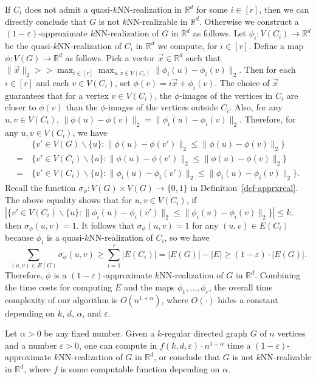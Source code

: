 If $C_i$ does not admit a quasi-$k$NN-realization in $\mathbb{R}^d$ for some $i \in [r]$, then we can directly conclude that $G$ is not $k$NN-realizable in $\mathbb{R}^d$.
Otherwise we construct a $(1-\varepsilon)$-approximate $k$NN-realization of $G$ in $\mathbb{R}^d$ as follows.
Let $\phi_i:V(C_i) \rightarrow \mathbb{R}^d$ be the quasi-$k$NN-realization of $C_i$ in $\mathbb{R}^d$ we compute, for $i \in [r]$.
Define a map $\phi:V(G) \rightarrow \mathbb{R}^d$ as follows.
Pick a vector $\vec{x} \in \mathbb{R}^d$ such that $\lVert \vec{x} \rVert_2 >> \max_{i \in [r]} \max_{u,v \in V(C_i)} \lVert \phi_i(u) - \phi_i(v) \rVert_2$.
Then for each $i \in [r]$ and each $v \in V(C_i)$, set $\phi(v) = i \vec{x} + \phi_i(v)$.
The choice of $\vec{x}$ guarantees that for a vertex $v \in V(C_i)$, the $\phi$-images of the vertices in $C_i$ are closer to $\phi(v)$ than the $\phi$-images of the vertices outside $C_i$.
Also, for any $u,v \in V(C_i)$, $\lVert \phi(u) - \phi(v) \rVert_2 = \lVert \phi_i(u) - \phi_i(v) \rVert_2$.
Therefore, for any $u,v \in V(C_i)$, we have
\begin{align*}
    & \ \{v' \in V(G) \backslash \{u\}: \lVert \phi(u) - \phi(v') \rVert_2 \leq \lVert \phi(u) - \phi(v) \rVert_2\} \\
    = & \ \{v' \in V(C_i) \backslash \{u\}: \lVert \phi(u) - \phi(v') \rVert_2 \leq \lVert \phi(u) - \phi(v) \rVert_2\} \\
    = & \ \{v' \in V(C_i) \backslash \{u\}: \lVert \phi_i(u) - \phi_i(v') \rVert_2 \leq \lVert \phi_i(u) - \phi_i(v) \rVert_2\}.
\end{align*}
Recall the function $\sigma_\phi:V(G) \times V(G) \rightarrow \{0,1\}$ in Definition~\ref{def-apprxreal}.
The above equality shows that for $u,v \in V(C_i)$, if $|\{v' \in V(C_i) \backslash \{u\}: \lVert \phi_i(u) - \phi_i(v') \rVert_2 \leq \lVert \phi_i(u) - \phi_i(v) \rVert_2\}| \leq k$, then $\sigma_\phi(u,v) = 1$.
It follows that $\sigma_\phi(u,v) = 1$ for any $(u,v) \in E(C_i)$ because $\phi_i$ is a quasi-$k$NN-realization of $C_i$,
so we have
\begin{equation*}
    \sum_{(u,v) \in E(G)} \sigma_\phi(u,v) \geq \sum_{i=1}^r |E(C_i)| = |E(G)| - |E| \geq (1-\varepsilon) \cdot |E(G)|.
\end{equation*}
Therefore, $\phi$ is a $(1-\varepsilon)$-approximate $k$NN-realization of $G$ in $\mathbb{R}^d$.
Combining the time costs for computing $E$ and the maps $\phi_1,\dots,\phi_r$, the overall time complexity of our algorithm is $O(n^{1+\alpha})$, where $O(\cdot)$ hides a constant depending on $k$, $d$, $\alpha$, and $\varepsilon$.
\begin{theorem}
Let $\alpha > 0$ be any fixed number.
Given a $k$-regular directed graph $G$ of $n$ vertices and a number $\varepsilon > 0$, one can compute in $f(k,d,\varepsilon) \cdot n^{1+\alpha}$ time a $(1-\varepsilon)$-approximate $k$NN-realization of $G$ in $\mathbb{R}^d$, or conclude that $G$ is not $k$NN-realizable in $\mathbb{R}^d$, where $f$ is some computable function depending on $\alpha$.
\end{theorem}

